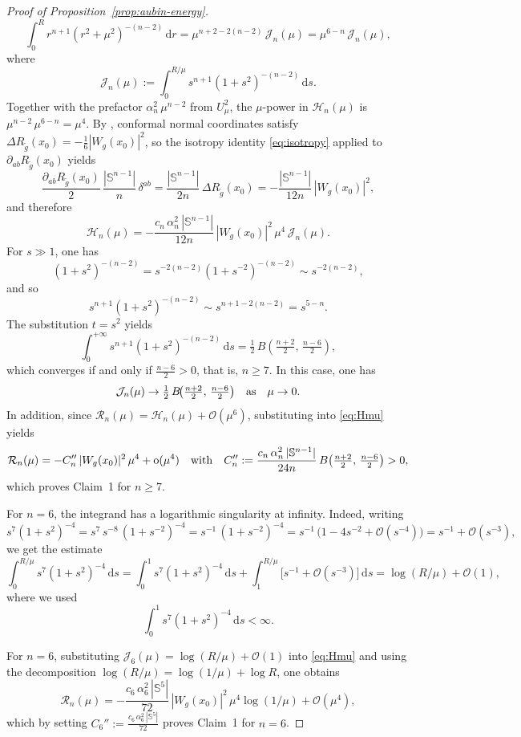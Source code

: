 \documentclass[reqno,11pt]{amsart}
\numberwithin{equation}{section}
\theoremstyle{definition}
\theoremstyle{remark}
\newcommand{\ud}{\,\mathrm{d}}
\newcommand{\Ss}{\mathbb{S}}
\begin{document}
\begin{proof}[Proof of Proposition~\ref{prop:aubin-energy}]
\[
\int_0^R r^{n+1}(r^2 + \mu^2)^{-(n-2)} \ud r = \mu^{n+2-2(n-2)}\,\mathcal{J}_n(\mu) = \mu^{6-n}\,\mathcal{J}_n(\mu),
\]
where
\[
\mathcal{J}_n(\mu) := \int_0^{R/\mu} s^{n+1}(1+s^2)^{-(n-2)} \ud s.
\]
Together with the prefactor $\alpha_n^2\,\mu^{n-2}$ from $U_\mu^2$, the $\mu$-power in $\mathcal{H}_n(\mu)$ is $\mu^{n-2}\,\mu^{6-n} = \mu^4$. By \cite[Lemma~6.4]{LP}, conformal normal coordinates satisfy $\Delta R_{\tilde{g}}(x_0) = -\tfrac{1}{6}|W_g(x_0)|^2$, so the isotropy identity \eqref{eq:isotropy} applied to $\partial_{ab}R_{\tilde{g}}(x_0)$ yields
\[
\frac{\partial_{ab}R_{\tilde{g}}(x_0)}{2}\,\frac{|\Ss^{n-1}|}{n}\,\delta^{ab} = \frac{|\Ss^{n-1}|}{2n}\,\Delta R_{\tilde{g}}(x_0) = -\frac{|\Ss^{n-1}|}{12n}\,|W_g(x_0)|^2,
\]
and therefore
\begin{equation}\label{eq:Hmu}
\mathcal{H}_n(\mu) = -\frac{c_n\,\alpha_n^2\,|\Ss^{n-1}|}{12n}\,|W_g(x_0)|^2\,\mu^4\,\mathcal{J}_n(\mu).
\end{equation}
For $s \gg 1$, one has 
\[
(1+s^2)^{-(n-2)} = s^{-2(n-2)}(1 + s^{-2})^{-(n-2)} \sim s^{-2(n-2)},
\]
and so
\[
s^{n+1}(1+s^2)^{-(n-2)} \sim s^{n+1-2(n-2)} = s^{5-n}.
\]
The substitution $t = s^2$ yields
\[
\int_0^{+\infty} s^{n+1}(1+s^2)^{-(n-2)} \ud s = \tfrac{1}{2}\, B\!\left(\tfrac{n+2}{2},\, \tfrac{n-6}{2}\right),
\]
which converges if and only if $\tfrac{n-6}{2} > 0$, that is, $n \geqslant 7$. In this case, one has 
\[
\mathcal{J}_n(\mu) \to \tfrac{1}{2}\,B\!\bigl(\tfrac{n+2}{2},\,\tfrac{n-6}{2}\bigr) \quad {\rm as} \quad \mu \to 0.
\]
In addition, since $\mathcal{R}_n(\mu) = \mathcal{H}_n(\mu) + \mathcal{O}(\mu^6)$, substituting into \eqref{eq:Hmu} yields
\[
\mathcal{R}_n(\mu) = -C_n''\,|W_g(x_0)|^2\,\mu^4 + \mathrm{o}(\mu^4) \quad {\rm with} \quad C_n'' := \frac{c_n\,\alpha_n^2\,|\Ss^{n-1}|}{24n}\,B\!\left(\tfrac{n+2}{2},\,\tfrac{n-6}{2}\right) > 0,
\]
which proves Claim~1 for $n \geqslant 7$.

For $n = 6$, the integrand has a logarithmic singularity at infinity. Indeed, writing
\[
s^7(1+s^2)^{-4} = s^7\, s^{-8}\,(1 + s^{-2})^{-4} = s^{-1}\,(1 + s^{-2})^{-4} = s^{-1}\,\bigl(1 - 4s^{-2} + \mathcal{O}(s^{-4})\bigr) = s^{-1} + \mathcal{O}(s^{-3}),
\]
we get the estimate
\[
\int_0^{R/\mu} s^7(1+s^2)^{-4} \ud s = \int_0^1 s^7(1+s^2)^{-4} \ud s + \int_1^{R/\mu} \bigl[s^{-1} + \mathcal{O}(s^{-3})\bigr] \ud s = \log(R/\mu) + \mathcal{O}(1),
\]
where we used 
\[
\int_0^1 s^7(1+s^2)^{-4} \ud s<\infty.
\]

For $n = 6$, substituting $\mathcal{J}_6(\mu) = \log(R/\mu) + \mathcal{O}(1)$ into \eqref{eq:Hmu} and using the decomposition $\log(R/\mu) = \log(1/\mu) + \log R$, one obtains
\[
\mathcal{R}_n(\mu) = -\frac{c_6\,\alpha_6^2\,|\Ss^5|}{72}\,|W_g(x_0)|^2\,\mu^4\log(1/\mu) + \mathcal{O}(\mu^4),
\]
which by setting $C_6'' := \tfrac{c_6\,\alpha_6^2\,|\Ss^5|}{72}$ proves Claim~1 for $n = 6$.


\end{proof}
\end{document}
